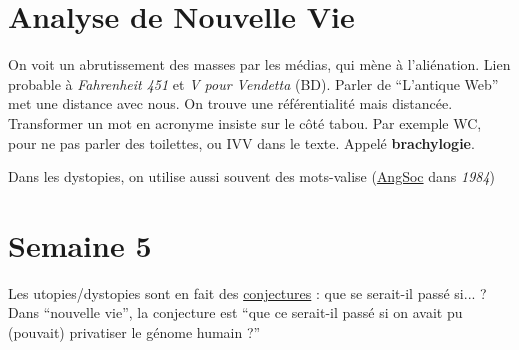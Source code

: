 \documentclass[12pt,a4paper]{book}
\begin{document}
\section{Analyse de Nouvelle Vie}
On voit un abrutissement des masses par les médias, qui mène à l'aliénation. Lien probable à \textit{Fahrenheit 451} et \textit{V pour Vendetta} (BD). Parler de ``L'antique Web'' met une distance avec nous. On trouve une référentialité mais distancée. Transformer un mot en acronyme insiste sur le côté tabou. Par exemple WC, pour ne pas parler des toilettes, ou IVV dans le texte. Appelé \textbf{brachylogie}.

Dans les dystopies, on utilise aussi souvent des mots-valise (\uline{AngSoc} dans \textit{1984})

\section{Semaine 5}
Les utopies/dystopies sont en fait des \uline{conjectures} : que se serait-il passé si... ? Dans ``nouvelle vie'', la conjecture est ``que ce serait-il passé si on avait pu (pouvait) privatiser le génome humain ?'' 
\end{document}
